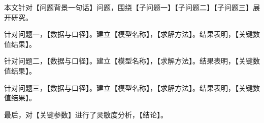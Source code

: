 
本文针对【问题背景一句话】问题，围绕【子问题一】【子问题二】【子问题三】展开研究。

针对问题一，【数据与口径】。建立【模型名称】，【求解方法】。结果表明，【关键数值结果】。

针对问题二，【数据与口径】。建立【模型名称】，【求解方法】。结果表明，【关键数值结果】。

针对问题三，【数据与口径】。建立【模型名称】，【求解方法】。结果表明，【关键数值结果】。

最后，对【关键参数】进行了灵敏度分析，【结论】。
